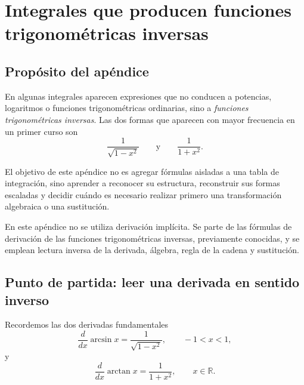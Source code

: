
\appendix
\section{Integrales que producen funciones trigonométricas inversas}
\label{ap:integrales-trig-inversas}

\subsection{Propósito del apéndice}

En algunas integrales aparecen expresiones que no conducen a potencias,
logaritmos o funciones trigonométricas ordinarias, sino a
\emph{funciones trigonométricas inversas}. Las dos formas que aparecen con
mayor frecuencia en un primer curso son
\[
\frac{1}{\sqrt{1-x^2}}
\qquad\text{y}\qquad
\frac{1}{1+x^2}.
\]

El objetivo de este apéndice no es agregar fórmulas aisladas a una tabla de
integración, sino aprender a reconocer su estructura, reconstruir sus formas
escaladas y decidir cuándo es necesario realizar primero una transformación
algebraica o una sustitución.

\begin{observacion}
En este apéndice no se utiliza derivación implícita. Se parte de las fórmulas
de derivación de las funciones trigonométricas inversas, previamente conocidas,
y se emplean lectura inversa de la derivada, álgebra, regla de la cadena y
sustitución.
\end{observacion}

\subsection{Punto de partida: leer una derivada en sentido inverso}

Recordemos las dos derivadas fundamentales
\[
\frac{d}{dx}\arcsin x=\frac{1}{\sqrt{1-x^2}},
\qquad -1<x<1,
\]
y
\[
\frac{d}{dx}\arctan x=\frac{1}{1+x^2},
\qquad x\in\mathbb{R}.
\]

